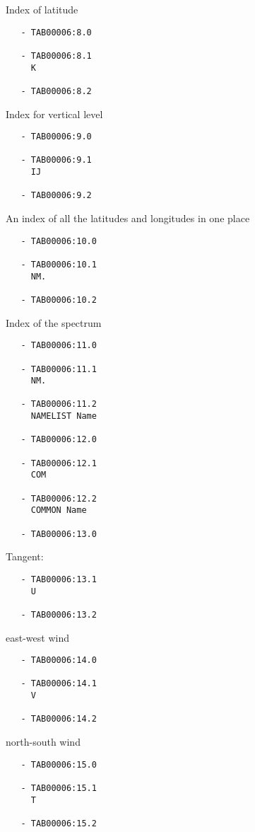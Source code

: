 Index of latitude

\begin{verbatim}
   - TAB00006:8.0
 
   - TAB00006:8.1 
     K
 
   - TAB00006:8.2 
\end{verbatim}

Index for vertical level

\begin{verbatim}
   - TAB00006:9.0
 
   - TAB00006:9.1 
     IJ
 
   - TAB00006:9.2 
\end{verbatim}

An index of all the latitudes and longitudes in one place

\begin{verbatim}
   - TAB00006:10.0
 
   - TAB00006:10.1 
     NM.
 
   - TAB00006:10.2 
\end{verbatim}

Index of the spectrum

\begin{verbatim}
   - TAB00006:11.0
 
   - TAB00006:11.1 
     NM.
 
   - TAB00006:11.2 
     NAMELIST Name
 
   - TAB00006:12.0
 
   - TAB00006:12.1 
     COM
 
   - TAB00006:12.2 
     COMMON Name
 
   - TAB00006:13.0 
\end{verbatim}

Tangent:

\begin{verbatim}
   - TAB00006:13.1 
     U
 
   - TAB00006:13.2 
\end{verbatim}

east-west wind

\begin{verbatim}
   - TAB00006:14.0
 
   - TAB00006:14.1 
     V
 
   - TAB00006:14.2 
\end{verbatim}

north-south wind

\begin{verbatim}
   - TAB00006:15.0
 
   - TAB00006:15.1 
     T
 
   - TAB00006:15.2 
\end{verbatim}


